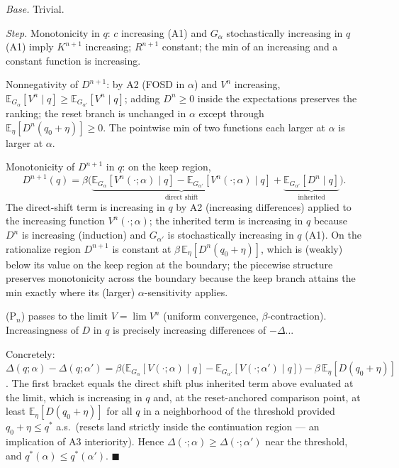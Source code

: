 \emph{Base.} Trivial.

\emph{Step.} Monotonicity in $q$: $c$ increasing (A1) and $G_\alpha$
stochastically increasing in $q$ (A1) imply $K^{n+1}$ increasing; $R^{n+1}$
constant; the min of an increasing and a constant function is increasing.

Nonnegativity of $D^{n+1}$: by A2 (FOSD in $\alpha$) and $V^n$ increasing,
$\mathbb{E}_{G_\alpha}[V^n \mid q] \geq \mathbb{E}_{G_{\alpha'}}[V^n \mid q]$;
adding $D^n \geq 0$ inside the expectations preserves the ranking; the
reset branch is unchanged in $\alpha$ except through
$\mathbb{E}_\eta[D^n(q_0+\eta)] \geq 0$. The pointwise min of two functions
each larger at $\alpha$ is larger at $\alpha$.

Monotonicity of $D^{n+1}$ in $q$: on the keep region,
\[
    D^{n+1}(q) = \beta\Big(
      \underbrace{\mathbb{E}_{G_\alpha}[V^n(\cdot;\alpha) \mid q]
      - \mathbb{E}_{G_{\alpha'}}[V^n(\cdot;\alpha) \mid q]}_{\text{direct shift}}
      + \underbrace{\mathbb{E}_{G_{\alpha'}}[D^n \mid q]}_{\text{inherited}}
    \Big).
\]
The direct-shift term is increasing in $q$ by A2 (increasing differences)
applied to the increasing function $V^n(\cdot;\alpha)$; the inherited term
is increasing in $q$ because $D^n$ is increasing (induction) and
$G_{\alpha'}$ is stochastically increasing in $q$ (A1). On the rationalize
region $D^{n+1}$ is constant at
$\beta\,\mathbb{E}_\eta[D^n(q_0+\eta)]$, which is (weakly) below its value
on the keep region at the boundary; the piecewise structure preserves
monotonicity across the boundary because the keep branch attains the min
exactly where its (larger) $\alpha$-sensitivity applies.

(P$_n$) passes to the limit $V = \lim V^n$ (uniform convergence,
$\beta$-contraction). Increasingness of $D$ in $q$ is precisely increasing
differences of $-\Delta$...

Concretely: $\Delta(q; \alpha) - \Delta(q; \alpha') =
\beta\big(\mathbb{E}_{G_\alpha}[V(\cdot;\alpha)\mid q] -
\mathbb{E}_{G_{\alpha'}}[V(\cdot;\alpha')\mid q]\big) -
\beta\,\mathbb{E}_\eta[D(q_0+\eta)]$. The first bracket equals the direct
shift plus inherited term above evaluated at the limit, which is
increasing in $q$ and, at the reset-anchored comparison point, at least
$\mathbb{E}_\eta[D(q_0+\eta)]$ for all $q$ in a neighborhood of the
threshold provided $q_0 + \eta \leq q^*$ a.s.\ (resets land strictly
inside the continuation region --- an implication of A3 interiority).
Hence $\Delta(\cdot; \alpha) \geq \Delta(\cdot; \alpha')$ near the
threshold, and $q^*(\alpha) \leq q^*(\alpha')$.
\hfill$\blacksquare$

